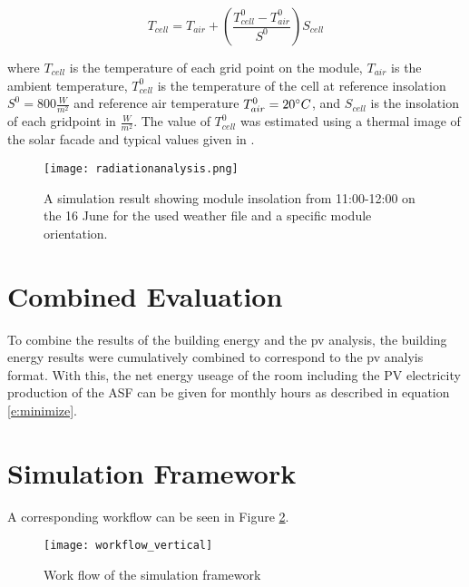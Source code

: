 		\begin{equation}
			T_{cell} = T_{air} + \left(\frac{T_{cell}^0-T_{air}^0}{S^0}\right)S_{cell}
      		\label{e:temp}
		\end{equation}

		where $T_{cell}$ is the temperature of each grid point on the module, $T_{air}$ is the ambient temperature, $T_{cell}^0$ is the temperature of the cell at reference insolation $S^0=800\frac{W}{m^2}$ and reference air temperature $T_{air}^0=20\degree C$, and $S_{cell}$ is the insolation of each gridpoint in $\frac{W}{m^2}$. The value of $T_{cell}^0$ was estimated using a thermal image of the solar facade and typical values given in \cite{Ross_Smokler_1986}. 

		\begin{figure}[H]
		\begin{center}
			\texttt{[image: radiationanalysis.png]}
			\caption{A simulation result showing module insolation from 11:00-12:00 on the 16 June for the used weather file and a specific module orientation.}
			\label{fig:radiation}
		\end{center}
		\end{figure}

	\section{Combined Evaluation}
		To combine the results of the building energy and the pv analysis, the building energy results were cumulatively combined to correspond to the pv analyis format. With this, the net energy useage of the room including the PV electricity production of the ASF can be given for monthly hours as described in equation \ref{e:minimize}. 

	\section{Simulation Framework}
		A corresponding workflow can be seen in Figure \ref{fig:workflow}. 

		\begin{figure}[ht] %
		\begin{center}
			\texttt{[image: workflow\_vertical]}
			\caption{Work flow of the simulation framework}
			\label{fig:workflow}
		\end{center} 
		\end{figure}

